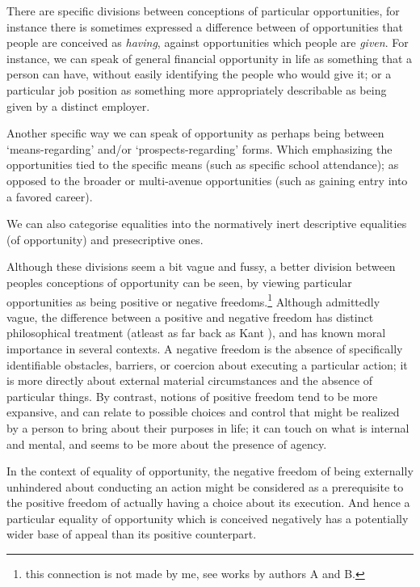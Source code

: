 \documentclass{article}
\begin{document}
There are specific divisions between conceptions of particular opportunities, for instance there is sometimes expressed a difference between of opportunities that people are conceived as \textit{having}, against opportunities which people are \textit{given}.\cite{mason2006levelling}
For instance, we can speak of general financial opportunity in life as something that a person can have, without easily identifying the people who would give it; or a particular job position as something more appropriately describable as being given by a distinct employer.

Another specific way we can speak of opportunity as perhaps being between `means-regarding' and/or `prospects-regarding' forms. %
Which emphasizing the opportunities tied to the specific means (such as specific school attendance); as opposed to the broader or multi-avenue opportunities (such as gaining entry into a favored career).

We can also categorise equalities into the normatively inert descriptive equalities (of opportunity) and presecriptive ones.

Although these divisions seem a bit vague and fussy, a better division between peoples conceptions of opportunity can be seen, by viewing particular opportunities as being positive or negative freedoms.\footnote{this connection is not made by me, see works by authors A and B.}
Although admittedly vague, the difference between a positive and negative freedom has distinct philosophical treatment (atleast as far back as Kant \cite{}), and has known moral importance in several contexts.
A negative freedom is the absence of specifically identifiable obstacles, barriers, or coercion about executing a particular action; it is more directly about external material circumstances and the absence of particular things.
By contrast, notions of positive freedom tend to be more expansive, and can relate to possible choices and control that might be realized by a person to bring about their purposes in life; it can touch on what is internal and mental, and seems to be more about the presence of agency.

In the context of equality of opportunity, the negative freedom of being externally unhindered about conducting an action might be considered as a prerequisite to the positive freedom of actually having a choice about its execution.
And hence a particular equality of opportunity which is conceived negatively has a  potentially wider base of appeal than its positive counterpart.
\end{document}
